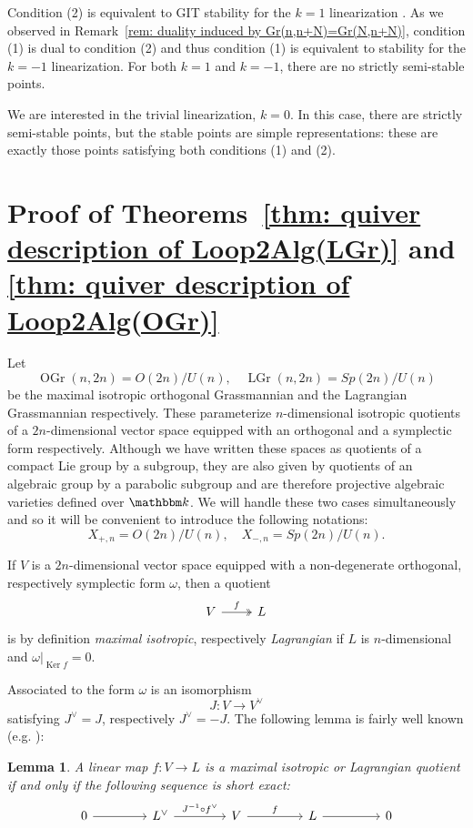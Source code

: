 \message{ !name(Bryan-Vakil.tex)}\documentclass{amsart}
\newtheorem{lemma}[theorem]{Lemma}
\theoremstyle{definition}
\newcommand{\kk} {{\mathbbm k}}
\newcommand{\Ker}{\operatorname{Ker}}
\newcommand{\LGr}{\operatorname{LGr}}
\newcommand{\OGr}{\operatorname{OGr}}
\begin{document}
Condition (2) is equivalent to GIT stability for the $k=1$
linearization \cite[Def.~2.2]{Nakajima-Handsaw}. As we observed in
Remark~\ref{rem: duality induced by Gr(n,n+N)=Gr(N,n+N)}, condition
(1) is dual to condition (2) and thus condition (1) is equivalent to
stability for the $k=-1$ linearization. For both $k=1$ and $k=-1$,
there are no strictly semi-stable points.

We are interested in the trivial linearization, $k=0$. In this case,
there are strictly semi-stable points, but the stable points are simple
representations: these are exactly those points satisfying both
conditions (1) and (2).

\section{Proof of Theorems~\ref{thm: quiver description of
Loop2Alg(LGr)} and \ref{thm: quiver description of
Loop2Alg(OGr)}}\label{sec: proofs of the Omega2(LG/OG) theorems}

Let 
\[
 \OGr (n,2n) = O(2n)/U(n), \quad \LGr (n,2n) = Sp(2n)/U(n)
\]
be the maximal isotropic orthogonal Grassmannian and the Lagrangian
Grassmannian respectively. These parameterize $n$-dimensional
isotropic quotients of a $2n$-dimensional vector space equipped with
an orthogonal and a symplectic form respectively. Although we have
written these spaces as quotients of a compact Lie group by a
subgroup, they are also given by quotients of an algebraic group by a
parabolic subgroup and are therefore projective algebraic varieties
defined over $\kk$. We will handle these two cases simultaneously and
so it will be convenient to introduce the following notations:
\[
X_{+,n} = O(2n)/U(n), \quad X_{-,n} = Sp(2n)/U(n).
\]

If $V$ is a $2n$-dimensional vector space equipped with a
non-degenerate orthogonal, respectively symplectic form $\omega$, then a
quotient
\[
\begin{tikzcd}
V \arrow[r,  two heads, "f"] & L
\end{tikzcd}
\]
is by definition \emph{maximal isotropic}, respectively \emph{Lagrangian} if $L$ is
$n$-dimensional and $\omega |_{\Ker f} = 0$. 

Associated to the form $\omega$ is an isomorphism
\[
J : V\to V^{\vee } 
\]
satisfying $J^{\vee} = J$, respectively $J^{\vee}=-J$. The following
lemma is fairly well known (e.g. \cite[\S~2]{Hitching-2007}):
\begin{lemma}\label{lem: lagrangian quotient condition as a ses}
A linear map $f:V\to L$ is a maximal isotropic or Lagrangian quotient if
and only if the following sequence is short exact:
\[
\begin{tikzcd}[column sep={6em,between origins}]
0 \arrow[r] &
L^{\vee } \arrow[r, "J^{-1}\circ f^{\vee}"] &
V \arrow[r, "f"] &
L \arrow[r] &
0
\end{tikzcd}
\]
\end{lemma}
\end{document}
